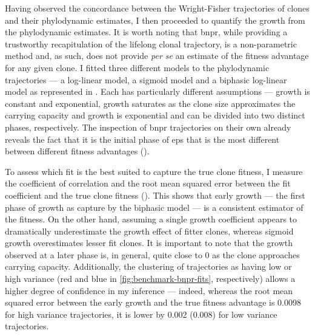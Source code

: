 \begin{figure}[!hb]
	\label{fig:high-variance-examples}
\end{figure}

Having observed the concordance between the Wright-Fisher trajectories of clones and their phylodynamic estimates, I then proceeded to quantify the growth from the phylodynamic estimates. It is worth noting that \ac{bnpr}, while providing a trustworthy recapitulation of the lifelong clonal trajectory, is a non-parametric method and, as such, does not provide \textit{per se} an estimate of the fitness advantage for any given clone. I fitted three different models to the phylodynamic trajectories --- a log-linear model, a sigmoid model and a biphasic log-linear model as represented in . Each has particularly different assumptions --- growth is constant and exponential, growth saturates as the clone size approximates the carrying capacity and growth is exponential and can be divided into two distinct phases, respectively. The inspection of \ac{bnpr} trajectories on their own already reveals the fact that it is the initial phase of \ac{eps} that is the most different between different fitness advantages ().

\begin{figure}[!ht]
	\label{fig:all-simulated-bnpr}
\end{figure}

To assess which fit is the best suited to capture the true clone fitness, I measure the coefficient of correlation and the root mean squared error between the fit coefficient and the true clone fitness (). This shows that early growth --- the first phase of growth as capture by the biphasic model --- is a consistent estimator of the fitness. On the other hand, assuming a single growth coefficient appears to dramatically underestimate the growth effect of fitter clones, whereas sigmoid growth overestimates lesser fit clones. It is important to note that the growth observed at a later phase is, in general, quite close to 0 as the clone approaches carrying capacity. Additionally, the clustering of trajectories as having low or high variance (red and blue in \ref{fig:benchmark-bnpr-fits}, respectively) allows a higher degree of confidence in my inference --- indeed, whereas the root mean squared error between the early growth and the true fitness advantage is 0.0098 for high variance trajectories, it is lower by 0.002 (0.008) for low variance trajectories. 

